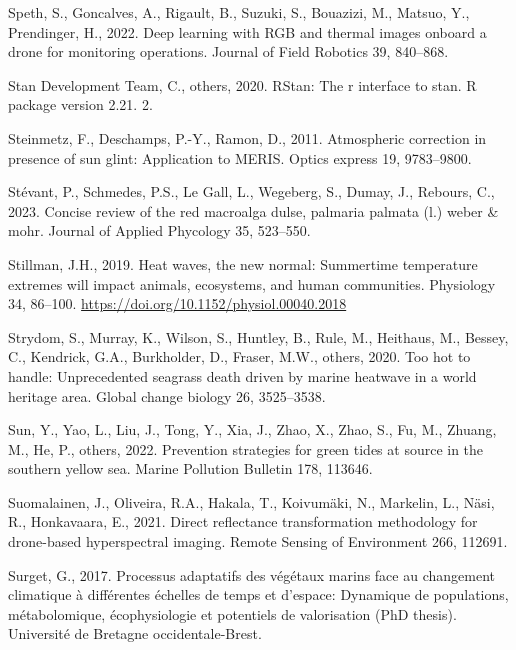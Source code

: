 \documentclass[
  letterpaper,
  11pt,
  english,
  singlespacing,
  headsepline]{MastersDoctoralThesis}
\newlength{\cslhangindent}
\newenvironment{CSLReferences}[2] %
 {\begin{list}{}{%
  \setlength{\itemindent}{0pt}
  \setlength{\leftmargin}{0pt}
  \setlength{\parsep}{0pt}
  \ifodd #1
   \setlength{\leftmargin}{\cslhangindent}
   \setlength{\itemindent}{-1\cslhangindent}
  \fi
  \setlength{\itemsep}{#2\baselineskip}}}
 {\end{list}}
\begin{document}
\begin{CSLReferences}{1}{0}
Speth, S., Goncalves, A., Rigault, B., Suzuki, S., Bouazizi, M., Matsuo,
Y., Prendinger, H., 2022. Deep learning with RGB and thermal images
onboard a drone for monitoring operations. Journal of Field Robotics 39,
840--868.

Stan Development Team, C., others, 2020. RStan: The r interface to stan.
R package version 2.21. 2.

Steinmetz, F., Deschamps, P.-Y., Ramon, D., 2011. Atmospheric correction
in presence of sun glint: Application to MERIS. Optics express 19,
9783--9800.

Stévant, P., Schmedes, P.S., Le Gall, L., Wegeberg, S., Dumay, J.,
Rebours, C., 2023. Concise review of the red macroalga dulse, palmaria
palmata (l.) weber \& mohr. Journal of Applied Phycology 35, 523--550.

Stillman, J.H., 2019. Heat waves, the new normal: Summertime temperature
extremes will impact animals, ecosystems, and human communities.
Physiology 34, 86--100. \url{https://doi.org/10.1152/physiol.00040.2018}

Strydom, S., Murray, K., Wilson, S., Huntley, B., Rule, M., Heithaus,
M., Bessey, C., Kendrick, G.A., Burkholder, D., Fraser, M.W., others,
2020. Too hot to handle: Unprecedented seagrass death driven by marine
heatwave in a world heritage area. Global change biology 26, 3525--3538.

Sun, Y., Yao, L., Liu, J., Tong, Y., Xia, J., Zhao, X., Zhao, S., Fu,
M., Zhuang, M., He, P., others, 2022. Prevention strategies for green
tides at source in the southern yellow sea. Marine Pollution Bulletin
178, 113646.

Suomalainen, J., Oliveira, R.A., Hakala, T., Koivumäki, N., Markelin,
L., Näsi, R., Honkavaara, E., 2021. Direct reflectance transformation
methodology for drone-based hyperspectral imaging. Remote Sensing of
Environment 266, 112691.

Surget, G., 2017. Processus adaptatifs des v{é}g{é}taux marins face au
changement climatique {à} diff{é}rentes {é}chelles de temps et d'espace:
Dynamique de populations, m{é}tabolomique, {é}cophysiologie et
potentiels de valorisation (PhD thesis). Universit{é} de Bretagne
occidentale-Brest.


\end{CSLReferences}
\end{document}
